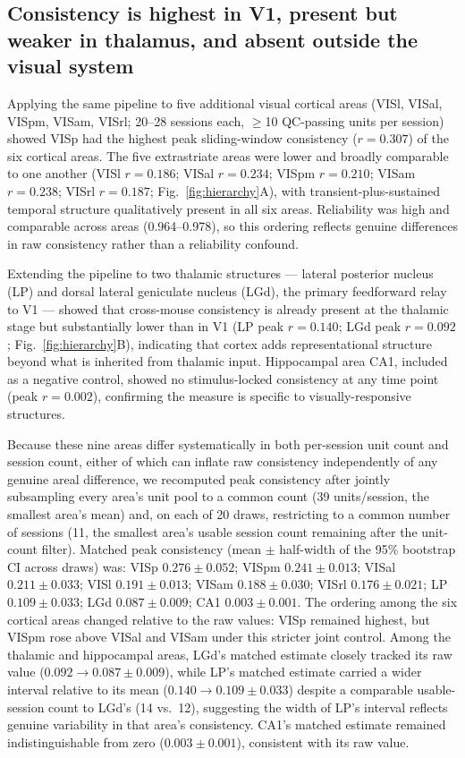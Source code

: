 \documentclass[11pt,onecolumn]{article}
\begin{document}
\subsection{Consistency is highest in V1, present but weaker in
thalamus, and absent outside the visual system}

Applying the same pipeline to five additional visual cortical areas
(VISl, VISal, VISpm, VISam, VISrl; 20--28 sessions each,
$\geq$10 QC-passing units per session) showed VISp had the highest peak
sliding-window consistency ($r = 0.307$) of the six cortical areas. The
five extrastriate areas were lower and broadly comparable to one another 
(VISl $r = 0.186$; VISal $r =
0.234$; VISpm $r = 0.210$; VISam $r = 0.238$; VISrl $r = 0.187$;
Fig.~\ref{fig:hierarchy}A), with transient-plus-sustained temporal
structure qualitatively present in all six areas. Reliability was high
and comparable across areas (0.964--0.978), so this ordering reflects
genuine differences in raw consistency rather than a reliability
confound.

Extending the pipeline to two thalamic structures --- lateral posterior
nucleus (LP) and dorsal lateral geniculate nucleus (LGd), the primary
feedforward relay to V1 --- showed that cross-mouse consistency is
already present at the thalamic stage but substantially lower than in
V1 (LP peak $r = 0.140$; LGd peak $r = 0.092$; Fig.~\ref{fig:hierarchy}B),
indicating that cortex adds representational structure beyond what is
inherited from thalamic input. Hippocampal area CA1, included as a
negative control, showed no stimulus-locked consistency at any time
point (peak $r = 0.002$), confirming the measure is specific to
visually-responsive structures.

Because these nine areas differ systematically in both per-session unit
count and session count, either of which can inflate raw consistency
independently of any genuine areal difference, we recomputed peak
consistency after jointly subsampling every area's unit pool to a common
count (39 units/session, the smallest area's mean) and, on each of 20
draws, restricting to a common number of sessions (11, the smallest
area's usable session count remaining after the unit-count filter).
Matched peak consistency (mean $\pm$ half-width of the 95\% bootstrap CI
across draws) was: VISp $0.276 \pm 0.052$; VISpm $0.241 \pm 0.013$;
VISal $0.211 \pm 0.033$; VISl $0.191 \pm 0.013$; VISam $0.188 \pm 0.030$;
VISrl $0.176 \pm 0.021$; LP $0.109 \pm 0.033$; LGd $0.087 \pm 0.009$;
CA1 $0.003 \pm 0.001$. The ordering among the six cortical areas changed
relative to the raw values: VISp remained highest, but VISpm rose above
VISal and VISam under this stricter joint control. 
Among the thalamic and hippocampal areas, LGd's matched
estimate closely tracked its raw value ($0.092 \to 0.087 \pm 0.009$),
while LP's matched estimate carried a wider interval relative to its mean
($0.140 \to 0.109 \pm 0.033$) despite a comparable usable-session count
to LGd's (14 vs.\ 12), suggesting the width of LP's interval reflects
genuine variability in that area's consistency. 
CA1's matched estimate remained indistinguishable from
zero ($0.003 \pm 0.001$), consistent with its raw value.
\end{document}
